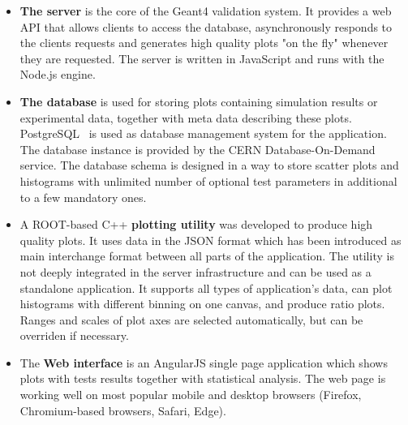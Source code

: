 \begin{itemize}

\item \textbf{The server} is the core of the Geant4 validation system. It provides a web API that allows clients to access the database, asynchronously responds to the clients requests and generates high quality plots "on the fly" whenever they are requested.
The server is written in JavaScript and runs with the Node.js engine.

\item \textbf{The database} is used for storing plots containing simulation results or experimental data, together with meta data describing these plots.
PostgreSQL~\cite{Postgre} is used as database management system for the application. The database instance is provided by the CERN Database-On-Demand service. The database schema is designed in a way to store scatter plots and histograms with unlimited number of optional test parameters in additional to a few mandatory ones.


\item A ROOT-based C++ \textbf{plotting utility} was developed to produce high quality plots. It uses data in the JSON format which has been introduced as main interchange format between all parts of the application. The utility is not deeply integrated in the server infrastructure and can be used as a standalone application. It supports all types of application's data, can plot histograms with different binning on one canvas, and produce ratio plots. Ranges and scales of plot axes are selected automatically, but can be overriden if necessary. %

\item The \textbf{Web interface} is an AngularJS single page application which shows plots with tests results together with statistical analysis. The web page is working well on most popular mobile and desktop browsers (Firefox, Chromium-based browsers, Safari, Edge).




\end{itemize}

